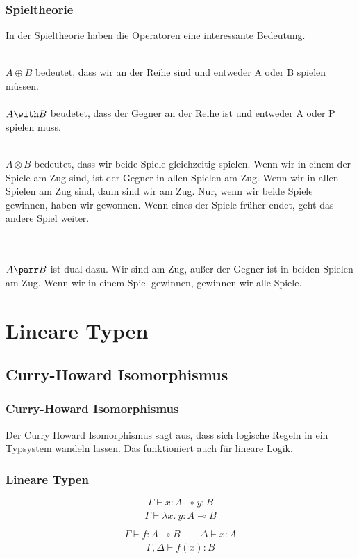 \documentclass{beamer}
\begin{document}
\begin{frame}
  \frametitle{Spieltheorie}
  In der Spieltheorie haben die Operatoren eine interessante Bedeutung. \\~\\ \pause

  $A \oplus B$ bedeutet, dass wir an der Reihe sind und entweder A oder B spielen müssen. \\~\\ \pause
  $A \with B$ beudetet, dass der Gegner an der Reihe ist und entweder A oder P spielen muss. \\~\\ \pause

  $A \otimes B$ bedeutet, dass wir beide Spiele gleichzeitig spielen. Wenn wir in einem der Spiele am Zug sind, ist der Gegner in allen Spielen am Zug. Wenn wir in allen Spielen am Zug sind, dann sind wir am Zug. Nur, wenn wir beide Spiele gewinnen, haben wir gewonnen. Wenn eines der Spiele früher endet, geht das andere Spiel weiter.

  \\~\\ \pause
  $A \parr B$ ist dual dazu. Wir sind am Zug, außer der Gegner ist in beiden Spielen am Zug. Wenn wir in einem Spiel gewinnen, gewinnen wir alle Spiele. 
\end{frame}

\section{Lineare Typen}
\subsection{Curry-Howard Isomorphismus}
\begin{frame}
  \frametitle{Curry-Howard Isomorphismus}

  Der Curry Howard Isomorphismus sagt aus, dass sich logische Regeln in ein Typsystem wandeln lassen. Das funktioniert auch für lineare Logik.
\end{frame}

\begin{frame}
  \frametitle{Lineare Typen}
    
  \begin{equation}
    \frac{\Gamma \vdash x : A \multimap y : B}
         {\Gamma \vdash \lambda x.\ y : A \multimap B}
  \end{equation}

  \pause%

  \begin{equation}
    \frac{\Gamma \vdash f : A \multimap B \qquad \Delta \vdash x : A}
         {\Gamma, \Delta \vdash f(x) : B}
  \end{equation}
\end{frame}
\end{document}
